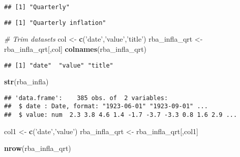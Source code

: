 \documentclass[]{article}
\newenvironment{Shaded}{\begin{snugshade}}{\end{snugshade}}
\newcommand{\KeywordTok}[1]{\textcolor[rgb]{0.13,0.29,0.53}{\textbf{#1}}}
\newcommand{\StringTok}[1]{\textcolor[rgb]{0.31,0.60,0.02}{#1}}
\newcommand{\CommentTok}[1]{\textcolor[rgb]{0.56,0.35,0.01}{\textit{#1}}}
\newcommand{\OperatorTok}[1]{\textcolor[rgb]{0.81,0.36,0.00}{\textbf{#1}}}
\newcommand{\NormalTok}[1]{#1}
\begin{document}
\begin{verbatim}
## [1] "Quarterly"
\end{verbatim}

\begin{Shaded}
\end{Shaded}

\begin{verbatim}
## [1] "Quarterly inflation"
\end{verbatim}

\begin{Shaded}
\begin{Highlighting}[]
      \CommentTok{# Trim datasets}
\NormalTok{      col <-}\StringTok{ }\KeywordTok{c}\NormalTok{(}\StringTok{'date'}\NormalTok{,}\StringTok{'value'}\NormalTok{,}\StringTok{'title'}\NormalTok{)}
\NormalTok{      rba_infla_qrt <-}\StringTok{ }\NormalTok{rba_infla_qrt[,col]}
      \KeywordTok{colnames}\NormalTok{(rba_infla_qrt)}
\end{Highlighting}
\end{Shaded}

\begin{verbatim}
## [1] "date"  "value" "title"
\end{verbatim}

\begin{Shaded}
\begin{Highlighting}[]
      \KeywordTok{str}\NormalTok{(rba_infla)}
\end{Highlighting}
\end{Shaded}

\begin{verbatim}
## 'data.frame':    385 obs. of  2 variables:
##  $ date : Date, format: "1923-06-01" "1923-09-01" ...
##  $ value: num  2.3 3.8 4.6 1.4 -1.7 -3.7 -3.3 0.8 1.6 2.9 ...
\end{verbatim}

\begin{Shaded}
\begin{Highlighting}[]
\NormalTok{      col1 <-}\StringTok{ }\KeywordTok{c}\NormalTok{(}\StringTok{'date'}\NormalTok{,}\StringTok{'value'}\NormalTok{)}
\NormalTok{      rba_infla_qrt <-}\StringTok{ }\NormalTok{rba_infla_qrt[,col1]}
      
      \KeywordTok{nrow}\NormalTok{(rba_infla_qrt)}
\end{Highlighting}
\end{Shaded}
\end{document}
